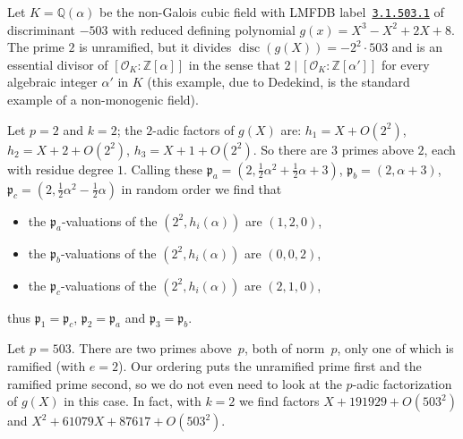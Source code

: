 \documentclass{article}
\def\Z{{\mathbb Z}}
\def\Q{{\mathbb Q}}
\def\OO{{\mathcal O}}
\def\p{{\mathfrak p}}
\DeclareMathOperator{\disc}{disc}
\begin{document}
Let $K=\Q(\alpha)$ be the non-Galois cubic field with LMFDB
label~\href{www.lmfdb.org/NumberField/3.1.503.1}{\texttt{3.1.503.1}}
of discriminant $-503$ with reduced defining polynomial
$g(x)=X^3-X^2+2X+8$.  The prime $2$ is unramified, but it divides
$\disc(g(X))=-2^2\cdot 503$ and is an essential divisor of
$[\OO_K:\Z[\alpha]]$ in the sense that $2\mid[\OO_K:\Z[\alpha']]$ for
every algebraic integer $\alpha'$ in $K$ (this example, due to
Dedekind, is the standard example of a non-monogenic field).

Let $p=2$ and $k=2$; the $2$-adic factors of $g(X)$ are: $h_1=X+O(2^2)$,
$h_2=X+2+O(2^2)$, $h_3=X+1+O(2^2)$.  So there are $3$
primes above $2$, each with residue degree $1$.
Calling these $\p_a = (2,\frac 12\alpha^2+\frac 12\alpha+3)$, $\p_b =
(2,\alpha+3)$, $\p_c = (2,\frac 12\alpha^2-\frac 12\alpha)$ in random order we find that
\begin{itemize}
  \item the $\p_a$-valuations of the $(2^2,h_i(\alpha))$ are $(1,2,0)$,
  \item the $\p_b$-valuations of the $(2^2,h_i(\alpha))$ are $(0,0,2)$,
  \item the $\p_c$-valuations of the $(2^2,h_i(\alpha))$ are $(2,1,0)$,
\end{itemize}
thus $\p_1=\p_c$, $\p_2=\p_a$ and $\p_3=\p_b$.

Let $p=503$.  There are two primes above~$p$, both of norm~$p$, only
one of which is ramified (with $e=2$). Our ordering puts the
unramified prime first and the ramified prime second, so we do not even need to
look at the $p$-adic factorization of $g(X)$ in this case.  In fact,
with $k=2$ we find factors $X+191929+O(503^2)$ and $X^2+61079X+87617+O(503^2)$.
\end{document}
